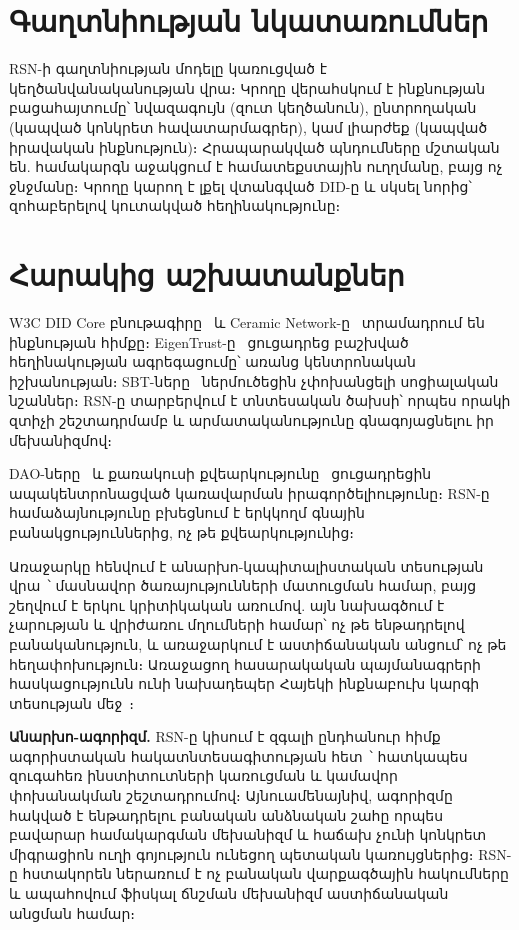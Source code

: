 \documentclass[11pt,a4paper,twocolumn]{article}
\begin{document}
\section{Գաղտնիության նկատառումներ}

RSN-ի գաղտնիության մոդելը կառուցված է կեղծանվանականության վրա։ Կրողը վերահսկում է ինքնության բացահայտումը՝ նվազագույն (զուտ կեղծանուն), ընտրողական (կապված կոնկրետ հավատարմագրեր), կամ լիարժեք (կապված իրավական ինքնություն)։ Հրապարակված պնդումները մշտական են. համակարգն աջակցում է համատեքստային ուղղմանը, բայց ոչ ջնջմանը։ Կրողը կարող է լքել վտանգված DID-ը և սկսել նորից՝ զոհաբերելով կուտակված հեղինակությունը։

\section{Հարակից աշխատանքներ}

W3C DID Core բնութագիրը~\cite{did2022} և Ceramic Network-ը~\cite{ceramic2023} տրամադրում են ինքնության հիմքը։ EigenTrust-ը~\cite{kamvar2003} ցուցադրեց բաշխված հեղինակության ագրեգացումը՝ առանց կենտրոնական իշխանության։ SBT-ները~\cite{weyl2022} ներմուծեցին չփոխանցելի սոցիալական նշաններ։ RSN-ը տարբերվում է տնտեսական ծախսի՝ որպես որակի զտիչի շեշտադրմամբ և արմատականությունը գնագոյացնելու իր մեխանիզմով։

DAO-ները~\cite{buterin2014} և քառակուսի քվեարկությունը~\cite{buterin2019} ցուցադրեցին ապակենտրոնացված կառավարման իրագործելիությունը։ RSN-ը համաձայնությունը բխեցնում է երկկողմ գնային բանակցություններից, ոչ թե քվեարկությունից։

Առաջարկը հենվում է անարխո-կապիտալիստական տեսության վրա~\cite{rothbard1973,hoppe2001}՝ մասնավոր ծառայությունների մատուցման համար, բայց շեղվում է երկու կրիտիկական առումով. այն նախագծում է չարության և վրիժառու մղումների համար՝ ոչ թե ենթադրելով բանականություն, և առաջարկում է աստիճանական անցում՝ ոչ թե հեղափոխություն։ Առաջացող հասարակական պայմանագրերի հասկացությունն ունի նախադեպեր Հայեկի ինքնաբուխ կարգի տեսության մեջ~\cite{hayek1973}։

\textbf{Անարխո-ագորիզմ.} RSN-ը կիսում է զգալի ընդհանուր հիմք ագորիստական հակատնտեսագիտության հետ~\cite{konkin2006}՝ հատկապես զուգահեռ ինստիտուտների կառուցման և կամավոր փոխանակման շեշտադրումով։ Այնուամենայնիվ, ագորիզմը հակված է ենթադրելու բանական անձնական շահը որպես բավարար համակարգման մեխանիզմ և հաճախ չունի կոնկրետ միգրացիոն ուղի գոյություն ունեցող պետական կառույցներից։ RSN-ը հստակորեն ներառում է ոչ բանական վարքագծային հակումները և ապահովում ֆիսկալ ճնշման մեխանիզմ աստիճանական անցման համար։
\end{document}
